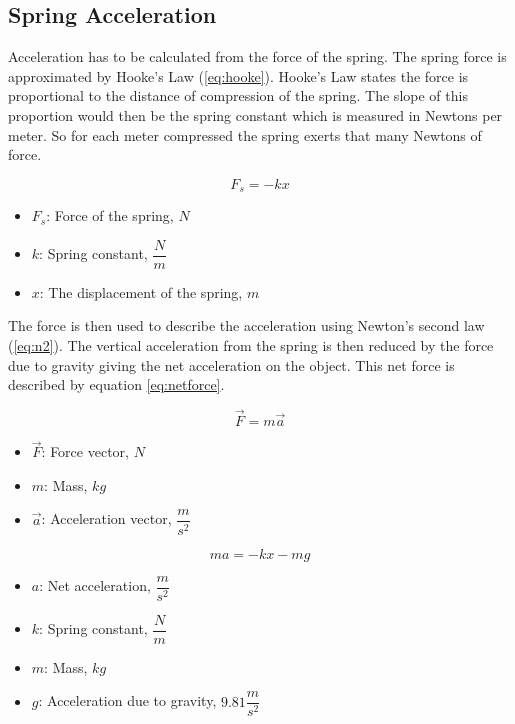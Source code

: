 \documentclass[12pt, letterpaper]{article}
\newcommand{\poses}[1]{#1's}
\begin{document}
\subsection{Spring Acceleration}
Acceleration has to be calculated from the force of the spring. The spring force is approximated by Hooke's
Law (\ref{eq:hooke}). Hooke's Law states the force is proportional to the distance of compression of the
spring. The slope of this proportion would then be the spring constant which is measured in Newtons per
meter. So for each meter compressed the spring exerts that many Newtons of force. 

\begin{singlespace}
  \begin{equation}
    \label{eq:hooke}
    F_s = -kx
  \end{equation}
  \begin{small}
    \begin{itemize}[label=]
      \item $F_s$: Force of the spring, $N$
      \item $k$: Spring constant, $\dfrac{N}{m}$
      \item $x$: The displacement of the spring, $m$
    \end{itemize}
  \end{small}
\end{singlespace}

The force is then used to describe the acceleration using \poses{Newton} second law (\ref{eq:n2}). The
vertical acceleration from the spring is then reduced by the force due to gravity giving the net acceleration
on the object. This net force is described by equation \ref{eq:netforce}.

\begin{singlespace}
  \begin{equation}
    \label{eq:n2}
    \vec{F} = m \vec{a}
  \end{equation}
  \begin{small}
    \begin{itemize}[label=]
      \item $\vec{F}$: Force vector, $N$
      \item $m$: Mass, $kg$
      \item $\vec{a}$: Acceleration vector, $\dfrac{m}{s^2}$
    \end{itemize}
  \end{small}
  \begin{equation}
    \label{eq:netforce}
    m a = -k x - m g
  \end{equation}
  \begin{small}
    \begin{itemize}[label=]
      \item $a$: Net acceleration, $\dfrac{m}{s^2}$
      \item $k$: Spring constant, $\dfrac{N}{m}$
      \item $m$: Mass, $kg$
      \item $g$: Acceleration due to gravity, $9.81 \dfrac{m}{s^2}$
    \end{itemize}
  \end{small}
\end{singlespace}
\end{document}
